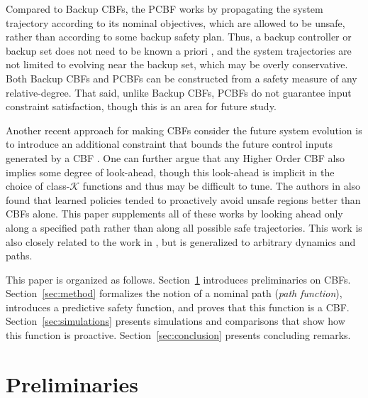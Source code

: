 \documentclass[10pt,conference]{ieeeconf}
\renewcommand{\(}{\left(}
\renewcommand{\)}{\right)}
\renewcommand{\[}{\left[}
\renewcommand{\]}{\right]}
\newcommand{\extendedversion}[1]{{\color{black}#1}}
\begin{document}
Compared to Backup CBFs, the PCBF works by propagating the system trajectory according to its nominal objectives, which are allowed to be unsafe, rather than according to some backup safety plan. Thus, a backup controller or backup set does not need to be known a priori \cite{backup_controller}, and the system trajectories are not limited to evolving near the backup set, which may be overly conservative. 
\extendedversion{Both Backup CBFs and PCBFs can be constructed from a safety measure of any relative-degree. }%
That said, unlike Backup CBFs, PCBFs do not guarantee input constraint satisfaction, though this is an area for future study. %

Another recent approach for making CBFs consider the future system evolution is to introduce an additional constraint that {bounds the} future control inputs generated by a CBF \cite{feasible_merging_cbfs,feasible_hocbfs}. One can further argue \cite[Sec. III-A]{CDC21} that any Higher Order CBF \cite{Exponential_CBF,hocbf_journal,Automatica} also implies some degree of look-ahead, though this look-ahead is implicit in the choice of class-$\mathcal{K}$ functions and thus may be difficult to tune. The authors in \cite{safe_learning_cbfs_proactive} also found that learned policies tended to proactively avoid unsafe regions better than CBFs alone. This paper supplements all of these works by looking ahead only along a specified path rather than along all possible {safe} trajectories. This work is also closely related to the work in \cite{mitchells_paper}, but is generalized to arbitrary dynamics and paths.

This paper is organized as follows. Section~\ref{sec:preliminaries} introduces preliminaries on CBFs. Section~\ref{sec:method} formalizes the notion of a nominal path (\emph{path function}), introduces a predictive safety function, and proves that this function is a CBF. Section~\ref{sec:simulations} presents simulations and comparisons that show how this function is proactive. Section~\ref{sec:conclusion} presents concluding remarks.

\section{Preliminaries} \label{sec:preliminaries}
\end{document}
